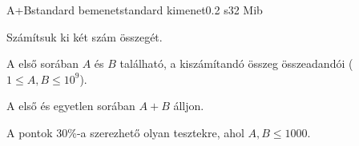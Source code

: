 \begin{problem}{A+B}{standard bemenet}{standard kimenet}{0.2 s}{32 Mib}

Számítsuk ki két szám összegét.

\Input
A \InputFileName első sorában $A$ és $B$ található, a kiszámítandó összeg összeadandói ($1 \leq A,B \leq 10^9$).

\Output
A \OutputFileName első és egyetlen sorában $A+B$ álljon.

\Examples

\begin{example}
\end{example}

\Scoring

A pontok 30\%-a szerezhető olyan tesztekre, ahol $A,B \leq 1000$.
\end{problem}
